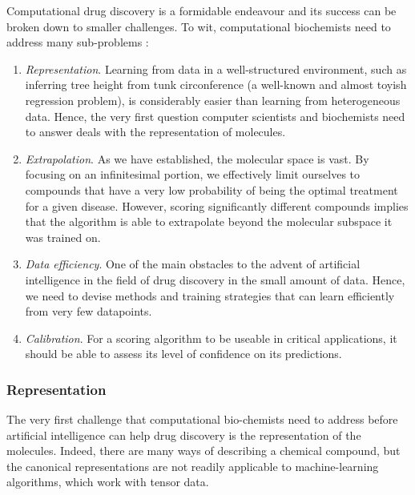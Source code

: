 \documentclass[11pt]{article}
\numberwithin{equation}{subsection}
\begin{document}
Computational drug discovery is a formidable endeavour and its success can be broken down to smaller challenges. To wit, computational biochemists need to address many sub-problems :
\begin{enumerate}
  \item \textit{Representation}. Learning from data in a well-structured environment, such as inferring tree height from tunk circonference (a well-known and almost toyish regression problem), is considerably easier than learning from heterogeneous data. Hence, the very first question computer scientists and biochemists need to answer deals with the representation of molecules.

  \item \textit{Extrapolation}. As we have established, the molecular space is vast. By focusing on an infinitesimal portion, we effectively limit ourselves to compounds that have a very low probability of being the optimal treatment for a given disease. However, scoring significantly different compounds implies that the algorithm is able to extrapolate beyond the molecular subspace it was trained on.

  \item \textit{Data efficiency}. One of the main obstacles to the advent of artificial intelligence in the field of drug discovery in the small amount of data. Hence, we need to devise methods and training strategies that can learn efficiently from very few datapoints.

  \item \textit{Calibration}. For a scoring algorithm to be useable in critical applications, it should be able to assess its level of confidence on its predictions.
\end{enumerate}



\subsubsection{Representation}

The very first challenge that computational bio-chemists need to address before artificial intelligence can help drug discovery is the representation of the molecules. Indeed, there are many ways of describing a chemical compound, but the canonical representations are not readily applicable to machine-learning algorithms, which work with tensor data.
\end{document}
